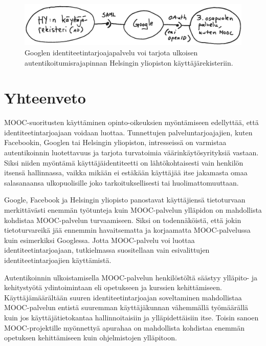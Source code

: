 \documentclass[finnish,gradu]{tktltiki}
\begin{document}
   \begin{figure}[h!]
     \centering
     \includegraphics[width=1.0\textwidth]{images/jatkokehitys-idp.jpg}
     \caption[Google välittäjäpalveluna Helsingin yliopiston käyttäjätunnuksille]{Googlen identiteetintarjoajapalvelu voi tarjota ulkoisen autentikoitumisrajapinnan Helsingin yliopiston käyttäjärekisteriin.}
     \label{fig:google-hy-idp}
   \end{figure}






\newpage
\section{Yhteenveto} %
\label{sec:yhteenveto}

  MOOC-suoritusten käyttäminen opinto-oikeuksien myöntämiseen edellyttää, että identiteetintarjoajaan voidaan luottaa. Tunnettujen palveluntarjoajajien, kuten Facebookin, Googlen tai Helsingin yliopiston, intresseissä on varmistaa autentikoinnin luotettavuus ja tarjota turvatoimia väärinkäytösyrityksiä vastaan. Siksi niiden myöntämä käyttäjäidentiteetti on lähtökohtaisesti vain henkilön itsensä hallinnassa, vaikka mikään ei estäkään käyttäjää itse jakamasta omaa salasanaansa ulkopuolisille joko tarkoituksellisesti tai huolimattomuuttaan.

  Google, Facebook ja Helsingin yliopisto panostavat käyttäjiensä tietoturvaan merkittävästi enemmän työtunteja kuin MOOC-palvelun ylläpidon on mahdollista kohdistaa MOOC-palvelun turvaamiseen. Siksi on todennäköistä, että jokin tietoturvareikä jää ennemmin havaitsematta ja korjaamatta MOOC-palvelussa kuin esimerkiksi Googlessa. Jotta MOOC-palvelu voi luottaa identiteetintarjoajaan, tutkielmassa suositellaan vain esivalittujen identiteetintarjoajien käyttämistä.

  Autentikoinnin ulkoistamisella MOOC-palvelun henkilöstöltä säästyy ylläpito- ja kehitystyötä ydintoimintaan eli opetukseen ja kurssien kehittämiseen. Käyttäjämäärältään suuren identiteetintarjoajan soveltaminen mahdollistaa MOOC-palvelun entistä suuremman käyttäjäkunnan vähemmällä työmäärällä kuin jos käyttäjätietokantaa hallinnoitaisiin ja ylläpidettäisiin itse. Toisin sanoen MOOC-projektille myönnettyä apurahaa on mahdollista kohdistaa enemmän opetuksen kehittämiseen kuin ohjelmistojen ylläpitoon.
\end{document}
